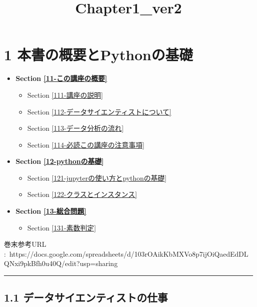 \documentclass[11pt]{article}
\title{Chapter1\_ver2}
\providecommand{\tightlist}{%
      \setlength{\itemsep}{0pt}\setlength{\parskip}{0pt}}
\begin{document}
    
    
    \maketitle
    
    

    
    \section{1
本書の概要とPythonの基礎}\label{ux672cux66f8ux306eux6982ux8981ux3068pythonux306eux57faux790e}

    \begin{itemize}
\tightlist
\item
  \textbf{Section \ref{11-この講座の概要}}

  \begin{itemize}
  \tightlist
  \item
    Section \ref{111-講座の説明}
  \item
    Section \ref{112-データサイエンティストについて}
  \item
    Section \ref{113-データ分析の流れ}
  \item
    Section \ref{114-必読この講座の注意事項} 
  \end{itemize}
\item
  \textbf{Section \ref{12-pythonの基礎}}

  \begin{itemize}
  \tightlist
  \item
    Section \ref{121-jupyterの使い方とpythonの基礎}
  \item
    Section \ref{122-クラスとインスタンス} 
  \end{itemize}
\item
  \textbf{Section \ref{13-総合問題}}

  \begin{itemize}
  \tightlist
  \item
    Section \ref{131-素数判定}
  \end{itemize}
\end{itemize}

    巻末参考URL
:~https://docs.google.com/spreadsheets/d/103rOAikKbMXVo8p7ijOiQaedEdDLQNxi9pkBfh0u40Q/edit?usp=sharing

    \begin{center}\rule{0.5\linewidth}{\linethickness}\end{center}

    \subsection{1.1
データサイエンティストの仕事}\label{ux30c7ux30fcux30bfux30b5ux30a4ux30a8ux30f3ux30c6ux30a3ux30b9ux30c8ux306eux4ed5ux4e8b}
\end{document}
